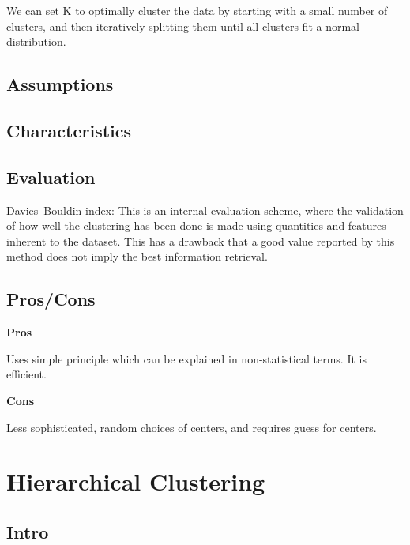 \documentclass[]{book}
\theoremstyle{definition}
\theoremstyle{definition}
\theoremstyle{definition}
\theoremstyle{remark}
\begin{document}
We can set K to optimally cluster the data by starting with a small
number of clusters, and then iteratively splitting them until all
clusters fit a normal distribution.

\subsection{Assumptions}\label{assumptions-3}

\subsection{Characteristics}\label{characteristics-3}

\subsection{Evaluation}\label{evaluation-3}

Davies--Bouldin index: This is an internal evaluation scheme, where the
validation of how well the clustering has been done is made using
quantities and features inherent to the dataset. This has a drawback
that a good value reported by this method does not imply the best
information retrieval.

\subsection{Pros/Cons}\label{proscons-3}

\textbf{Pros}

Uses simple principle which can be explained in non-statistical terms.
It is efficient.

\textbf{Cons}

Less sophisticated, random choices of centers, and requires guess for
centers.

\section{Hierarchical Clustering}\label{hierarchical-clustering}

\subsection{Intro}\label{intro-4}
\end{document}

